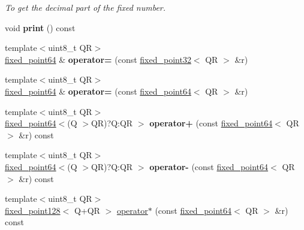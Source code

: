 \begin{DoxyCompactItemize}
\begin{DoxyCompactList}\small\item\em To get the decimal part of the fixed number. \end{DoxyCompactList}\item 
\mbox{\label{structaacio_1_1fixed__point64_aaea3e54bcda0d539c36beef083382eac}} 
void {\bfseries print} () const
\item 
\mbox{\label{structaacio_1_1fixed__point64_acd5f51e9513f45fd5a277402bf802113}} 
{\footnotesize template$<$uint8\+\_\+t QR$>$ }\\\mbox{\hyperlink{structaacio_1_1fixed__point64}{fixed\+\_\+point64}} \& {\bfseries operator=} (const \mbox{\hyperlink{structaacio_1_1fixed__point32}{fixed\+\_\+point32}}$<$ QR $>$ \&r)
\item 
\mbox{\label{structaacio_1_1fixed__point64_af3e9af0631b676f7c200141e985cb0a6}} 
{\footnotesize template$<$uint8\+\_\+t QR$>$ }\\\mbox{\hyperlink{structaacio_1_1fixed__point64}{fixed\+\_\+point64}} \& {\bfseries operator=} (const \mbox{\hyperlink{structaacio_1_1fixed__point64}{fixed\+\_\+point64}}$<$ QR $>$ \&r)
\item 
\mbox{\label{structaacio_1_1fixed__point64_af85f4385e817949633ba03f81e174454}} 
{\footnotesize template$<$uint8\+\_\+t QR$>$ }\\\mbox{\hyperlink{structaacio_1_1fixed__point64}{fixed\+\_\+point64}}$<$(Q $>$QR)?Q\+:\+QR $>$ {\bfseries operator+} (const \mbox{\hyperlink{structaacio_1_1fixed__point64}{fixed\+\_\+point64}}$<$ QR $>$ \&r) const
\item 
\mbox{\label{structaacio_1_1fixed__point64_ad976c51e7f403698ffbb403dc6f04c44}} 
{\footnotesize template$<$uint8\+\_\+t QR$>$ }\\\mbox{\hyperlink{structaacio_1_1fixed__point64}{fixed\+\_\+point64}}$<$(Q $>$QR)?Q\+:\+QR $>$ {\bfseries operator-\/} (const \mbox{\hyperlink{structaacio_1_1fixed__point64}{fixed\+\_\+point64}}$<$ QR $>$ \&r) const
\item 
{\footnotesize template$<$uint8\+\_\+t QR$>$ }\\\mbox{\hyperlink{structaacio_1_1fixed__point128}{fixed\+\_\+point128}}$<$ Q+QR $>$ \mbox{\hyperlink{group__fixedpoint_ga21d919b0487e65e733c35adb41848a34}{operator$\ast$}} (const \mbox{\hyperlink{structaacio_1_1fixed__point64}{fixed\+\_\+point64}}$<$ QR $>$ \&r) const

\end{DoxyCompactItemize}
